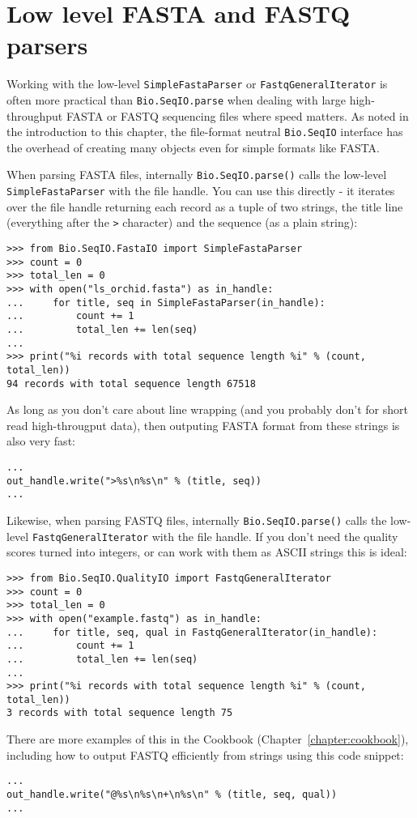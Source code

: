 \section{Low level FASTA and FASTQ parsers}
\label{sec:low-level-fasta-fastq}

Working with the low-level \verb|SimpleFastaParser| or
\verb|FastqGeneralIterator| is often more practical than
\verb|Bio.SeqIO.parse| when dealing with large high-throughput FASTA
or FASTQ sequencing files where speed matters.
As noted in the introduction to this chapter, the file-format neutral
\verb|Bio.SeqIO| interface has the overhead of creating many objects
even for simple formats like FASTA.

When parsing FASTA files, internally \verb|Bio.SeqIO.parse()| calls
the low-level \verb|SimpleFastaParser| with the file handle.
You can use this directly - it iterates over the file handle returning
each record as a tuple of two strings, the title line (everything after
the \verb|>| character) and the sequence (as a plain string):

\begin{verbatim}
>>> from Bio.SeqIO.FastaIO import SimpleFastaParser
>>> count = 0
>>> total_len = 0
>>> with open("ls_orchid.fasta") as in_handle:
...     for title, seq in SimpleFastaParser(in_handle):
...         count += 1
...         total_len += len(seq)
...
>>> print("%i records with total sequence length %i" % (count, total_len))
94 records with total sequence length 67518
\end{verbatim}

As long as you don't care about line wrapping (and you probably don't
for short read high-througput data), then outputing FASTA format from
these strings is also very fast:

\begin{verbatim}
...
out_handle.write(">%s\n%s\n" % (title, seq))
...
\end{verbatim}

Likewise, when parsing FASTQ files, internally \verb|Bio.SeqIO.parse()|
calls the low-level \verb|FastqGeneralIterator| with the file handle.
If you don't need the quality scores turned into integers,
or can work with them as ASCII strings this is ideal:

\begin{verbatim}
>>> from Bio.SeqIO.QualityIO import FastqGeneralIterator
>>> count = 0
>>> total_len = 0
>>> with open("example.fastq") as in_handle:
...     for title, seq, qual in FastqGeneralIterator(in_handle):
...         count += 1
...         total_len += len(seq)
...
>>> print("%i records with total sequence length %i" % (count, total_len))
3 records with total sequence length 75
\end{verbatim}

There are more examples of this in the Cookbook (Chapter~\ref{chapter:cookbook}),
including how to output FASTQ efficiently from strings using this code snippet:

\begin{verbatim}
...
out_handle.write("@%s\n%s\n+\n%s\n" % (title, seq, qual))
...
\end{verbatim}
